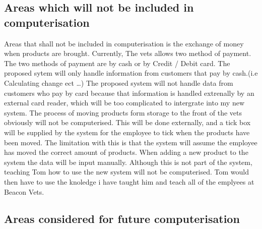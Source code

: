\subsection{Areas which will not be included in computerisation}

\begin{flushleft}
Areas that shall not be included in computerisation is the exchange of money when products are brought. Currently, The vets allows two method of payment. The two methods of payment are by cash or by Credit / Debit card. The proposed sytem will only handle information from customers that pay by cash.(i.e Calculating change ect \ldots) The proposed system will not handle data from customers who pay by card because that information is handled extrenally by an external card reader, which will be too complicated to intergrate into my new system. The process of moving products form storage to the front of the vets obviously will not be computerised. This will be done externally, and a tick box will be supplied by the system for the employee to tick when the products have been moved. The limitation with this is that the system will assume the employee has moved the correct amount of products. When adding a new product to the system the data will be input manually. Although this is not part of the system, teaching Tom how to use the new system will not be computerised. Tom would then have to use the knoledge i have taught him and teach all of the emplyees at Beacon Vets.
\end{flushleft}

\subsection{Areas considered for future computerisation}

